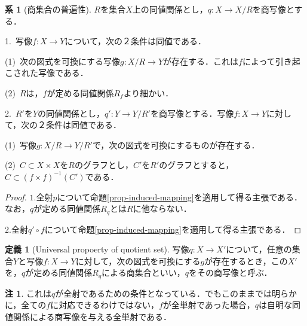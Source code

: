 \documentclass[uplatex, 12pt, dvipdfmx]{jsreport}
\theoremstyle{definition}
\newtheorem{corollary}[theorem]{系}
\newtheorem{definition}[theorem]{定義}
\newtheorem{remark}[theorem]{注}
\theoremstyle{StatementsWithStar}
\theoremstyle{StatementsWithStar2}
\theoremstyle{StatementsWithStar3}
\theoremstyle{StatementsWithCCirc}
\theoremstyle{definition}
\begin{document}
\begin{corollary}[商集合の普遍性]
    $R$を集合$X$上の同値関係とし，$q:X\to X/R$を商写像とする．\rm{}
    
    1.\, 写像$f:X\to Y$について，次の２条件は同値である．

    (1)\, 次の図式を可換にする写像$g:X/R\to Y$が存在する．これは$f$によって引き起こされた写像である．
    \begin{center}\end{center}

    (2)\, $R$は，$f$が定める同値関係$R_f$より細かい．

    2.\, $R'$を$Y$の同値関係とし，$q':Y\to Y/R'$を商写像とする．写像$f:X\to Y$に対して，次の２条件は同値である．

    (1)\, 写像$g:X/R\to Y/R'$で，次の図式を可換にするものが存在する．
    \begin{center}\end{center}

    (2)\, $C\subset X\times X$を$R$のグラフとし，$C'$を$R'$のグラフとすると，$C\subset (f\times f)^{-1}(C')$である．
\end{corollary}
\begin{proof}
    $1.$全射$p$について命題\ref{prop-induced-mapping}を適用して得る主張である．なお，$q$が定める同値関係$R_q$とは$R$に他ならない．
    
    $2.$全射$q'\circ f$について命題\ref{prop-induced-mapping}を適用して得る主張である．
\end{proof}

\begin{definition}[Universal propoerty of quotient set]
    写像$q:X\to X'$について，任意の集合$Y$と写像$f:X\to Y$に対して，次の図式を可換にする$g$が存在するとき，この$X'$を，$q$が定める同値関係$R_q$による商集合といい，$q$をその商写像と呼ぶ．
    \begin{center}\end{center}
\end{definition}
\begin{remark}
    これは$q$が全射であるための条件となっている．でもこのままでは明らかに，全ての$f$に対応できるわけではない，$f$が全単射であった場合，$q$は自明な同値関係による商写像を与える全単射である．
\end{remark}
\end{document}
